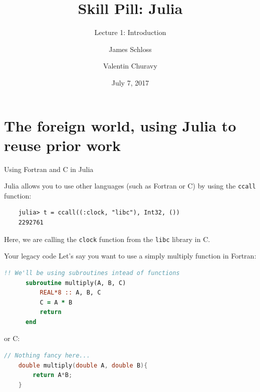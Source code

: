 \documentclass{beamer}
\title[Skill Pill]{Skill Pill: Julia} %
\subtitle{Lecture 1: Introduction}
\author{James Schloss \and Valentin Churavy} %
\institute[OIST] %
{
Okinawa Institute of Science and Technology \\ %
\textit{james.schloss@oist.jp}\\
\textit{valentin.churavy@oist.jp} %
}
\date{July 7, 2017} %
\begin{document}

\begin{frame}
\vspace*{1.4cm}
\titlepage %
\end{frame}



\begin{frame}
  \tableofcontents
\end{frame}
\section{The foreign world, using Julia to reuse prior work}
\begin{frame}[fragile]{Using Fortran and C in Julia}

Julia allows you to use other languages (such as Fortran or C) by using the \texttt{ccall} function:

\begin{lstlisting}
    julia> t = ccall((:clock, "libc"), Int32, ())
    2292761
\end{lstlisting}

Here, we are calling the \texttt{clock} function from the \texttt{libc} library in C.

\end{frame}

\begin{frame}[fragile]{Your legacy code}
Let's say you want to use a simply multiply function in Fortran:
\begin{lstlisting}[language=fortran]
      !! We'll be using subroutines intead of functions 
      subroutine multiply(A, B, C)
          REAL*8 :: A, B, C
          C = A * B
          return
      end
\end{lstlisting}
\vspace{0.5cm}
or C:
\begin{lstlisting}[language=c]
    // Nothing fancy here...
    double multiply(double A, double B){
        return A*B;
    }
\end{lstlisting}
\end{frame}
\end{document}
